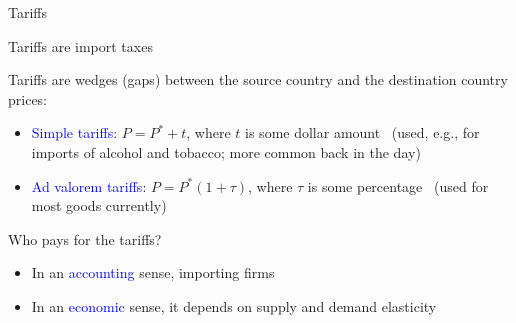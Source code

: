 \documentclass[notes,11pt, aspectratio=169, xcolor=table]{beamer}
\newcommand{\blue}[1]{\textcolor{blue}{#1}}
\newenvironment{wideitemize}{\itemize\addtolength{\itemsep}{10pt}}{\enditemize}
\begin{document}
\begin{frame}{Tariffs}
\begin{wideitemize}
    \item Tariffs are import taxes
    \item<2-> Tariffs are wedges (gaps) between the source country and the destination country prices:
    \begin{itemize}
        \item \blue{Simple tariffs}: $P = P^* + t$, where $t$ is some dollar amount \
        \qquad (used, e.g., for imports of alcohol and tobacco; more common back in the day)
        \item \blue{Ad valorem tariffs}: $P = P^*(1+\tau)$, where $\tau$ is some percentage \
        \qquad (used for most goods currently)
    \end{itemize}
    \item<3-> Who pays for the tariffs?
    \begin{itemize}
        \item<4-> In an \blue{accounting} sense, importing firms
        \item<5-> In an \blue{economic} sense, it depends on supply and demand elasticity
    \end{itemize}
\end{wideitemize}
    
\end{frame}
\end{document}
